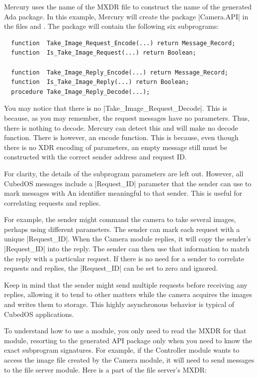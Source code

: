 Mercury uses the name of the MXDR file to construct the name of the generated Ada package. In
this example, Mercury will create the package |Camera.API| in the files
 and . The package will contain the following
six subprograms:

\begin{verbatim}
  function  Take_Image_Request_Encode(...) return Message_Record;
  function  Is_Take_Image_Request(...) return Boolean;

  function  Take_Image_Reply_Encode(...) return Message_Record;
  function  Is_Take_Image_Reply(...) return Boolean;
  procedure Take_Image_Reply_Decode(...);
\end{verbatim}

You may notice that there is no |Take_Image_Request_Decode|. This is because, as you may
remember, the request messages have no parameters. Thus, there is nothing to decode. Mercury 
can detect this and will make no decode function. There is however, an encode function. This
is because, even though there is no XDR encoding of parameters, an empty message still must be
constructed with the correct sender address and request ID. 

For clarity, the details of the subprogram parameters are left out. However, all CubedOS
messages include a |Request_ID| parameter that the sender can use to mark messages with An
identifier meaningful to that sender. This is useful for correlating requests and replies.

For example, the sender might command the camera to take several images, perhaps using different
parameters. The sender can mark each request with a unique |Request_ID|. When the Camera module
replies, it will copy the sender's |Request_ID| into the reply. The sender can then use that
information to match the reply with a particular request. If there is no need for a sender to
correlate requests and replies, the |Request_ID| can be set to zero and ignored.

Keep in mind that the sender might send multiple requests before receiving any replies, allowing
it to tend to other matters while the camera acquires the images and writes them to storage.
This highly asynchronous behavior is typical of CubedOS applications.

To understand how to use a module, you only need to read the MXDR for that module, resorting to
the generated API package only when you need to know the exact subprogram signatures. For
example, if the Controller module wants to access the image file created by the Camera module,
it will need to send messages to the file server module. Here is a part of the file server's
MXDR:

